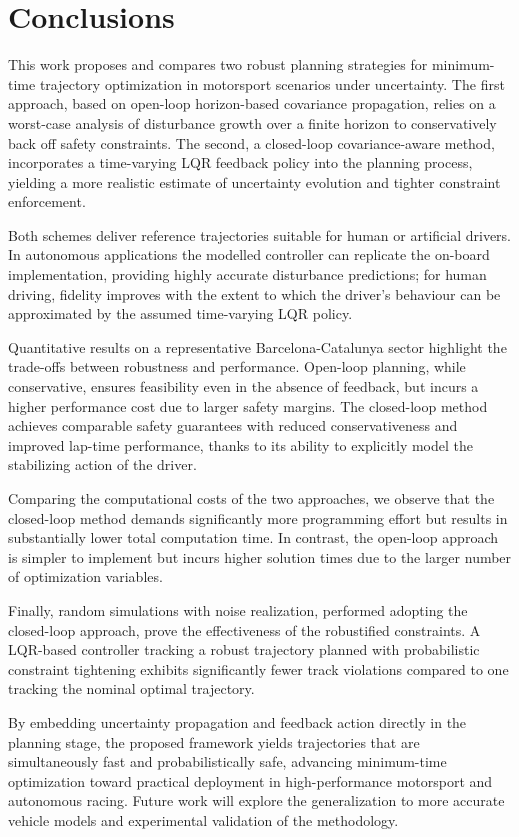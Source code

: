 \section{Conclusions}
\label{sec:conclusions}

This work proposes and compares two robust planning strategies for minimum-time trajectory optimization in motorsport scenarios under uncertainty. The first approach, based on open-loop horizon-based covariance propagation, relies on a worst-case analysis of disturbance growth over a finite horizon to conservatively back off safety constraints. The second, a closed-loop covariance-aware method, incorporates a time-varying LQR feedback policy into the planning process, yielding a more realistic estimate of uncertainty evolution and tighter constraint enforcement.

Both schemes deliver reference trajectories suitable for human or artificial drivers. In autonomous applications the modelled controller can replicate the on-board implementation, providing highly accurate disturbance predictions; for human driving, fidelity improves with the extent to which the driver's behaviour can be approximated by the assumed time-varying LQR policy.

Quantitative results on a representative Barcelona-Catalunya sector highlight the trade-offs between robustness and performance. Open-loop planning, while conservative, ensures feasibility even in the absence of feedback, but incurs a higher performance cost due to larger safety margins. The closed-loop method achieves comparable safety guarantees with reduced conservativeness and improved lap-time performance, thanks to its ability to explicitly model the stabilizing action of the driver.

Comparing the computational costs of the two approaches, we observe that the closed-loop method demands significantly more programming effort but results in substantially lower total computation time. In contrast, the open-loop approach is simpler to implement but incurs higher solution times due to the larger number of optimization variables.

Finally, random simulations with noise realization, performed adopting the closed-loop approach, prove the effectiveness of the robustified constraints. A LQR-based controller tracking a robust trajectory planned with probabilistic constraint tightening exhibits significantly fewer track violations compared to one tracking the nominal optimal trajectory.

By embedding uncertainty propagation and feedback action directly in the planning stage, the proposed framework yields trajectories that are simultaneously fast and probabilistically safe, advancing minimum-time optimization toward practical deployment in high-performance motorsport and autonomous racing. Future work will explore the generalization to more accurate vehicle models and experimental validation of the methodology. 